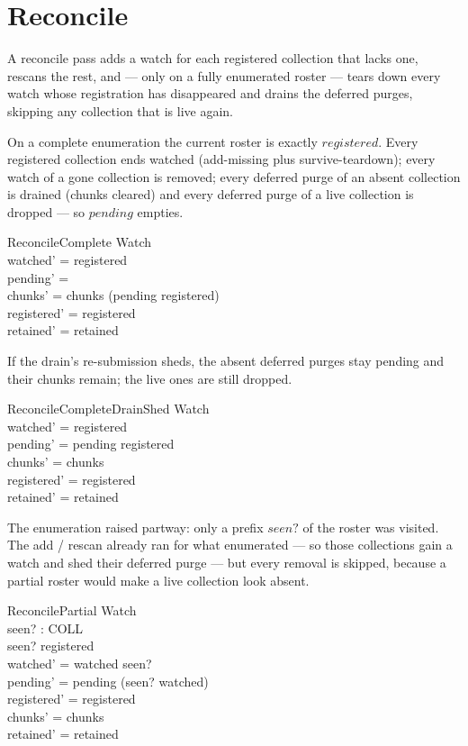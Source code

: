 \documentclass[a4paper]{article}
\begin{document}
\section{Reconcile}

A reconcile pass adds a watch for each registered collection that lacks one,
rescans the rest, and --- only on a fully enumerated roster --- tears down every
watch whose registration has disappeared and drains the deferred purges,
skipping any collection that is live again.

On a complete enumeration the current roster is exactly $registered$.  Every
registered collection ends watched (add-missing plus survive-teardown); every
watch of a gone collection is removed; every deferred purge of an absent
collection is drained (chunks cleared) and every deferred purge of a live
collection is dropped --- so $pending$ empties.

\begin{schema}{ReconcileComplete}
  \Delta Watch \\
  \where
  watched' = registered \\
  pending' = \emptyset \\
  chunks' = chunks \setminus (pending \setminus registered) \\
  registered' = registered \\
  retained' = retained
\end{schema}

If the drain's re-submission sheds, the absent deferred purges stay pending and
their chunks remain; the live ones are still dropped.

\begin{schema}{ReconcileCompleteDrainShed}
  \Delta Watch \\
  \where
  watched' = registered \\
  pending' = pending \setminus registered \\
  chunks' = chunks \\
  registered' = registered \\
  retained' = retained
\end{schema}

The enumeration raised partway: only a prefix $seen?$ of the roster was visited.
The add / rescan already ran for what enumerated --- so those collections gain a
watch and shed their deferred purge --- but every removal is skipped, because a
partial roster would make a live collection look absent.

\begin{schema}{ReconcilePartial}
  \Delta Watch \\
  seen? : \power COLL \\
  \where
  seen? \subseteq registered \\
  watched' = watched \cup seen? \\
  pending' = pending \setminus (seen? \setminus watched) \\
  registered' = registered \\
  chunks' = chunks \\
  retained' = retained
\end{schema}
\end{document}
